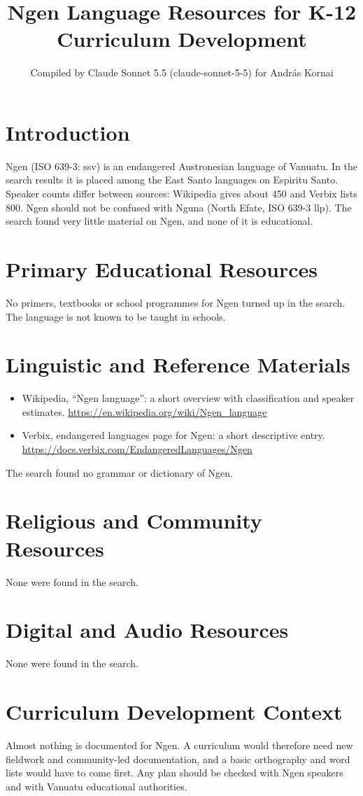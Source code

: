 \documentclass[12pt]{article}
\title{Ngen Language Resources for K-12 Curriculum Development}
\author{Compiled by Claude Sonnet 5.5 (claude-sonnet-5-5) for Andr\'as Kornai}
\date{}
\begin{document}
\maketitle

\section{Introduction}
Ngen (ISO 639-3: ssv) is an endangered Austronesian language of Vanuatu. In the search results it is placed among the East Santo languages on Espiritu Santo. Speaker counts differ between sources: Wikipedia gives about 450 and Verbix lists 800. Ngen should not be confused with Nguna (North Efate, ISO 639-3 llp). The search found very little material on Ngen, and none of it is educational.

\section{Primary Educational Resources}
No primers, textbooks or school programmes for Ngen turned up in the search. The language is not known to be taught in schools.

\section{Linguistic and Reference Materials}
\begin{itemize}
\item Wikipedia, ``Ngen language'': a short overview with classification and speaker estimates. \url{https://en.wikipedia.org/wiki/Ngen_language}
\item Verbix, endangered languages page for Ngen: a short descriptive entry. \url{https://docs.verbix.com/EndangeredLanguages/Ngen}
\end{itemize}
The search found no grammar or dictionary of Ngen.

\section{Religious and Community Resources}
None were found in the search.

\section{Digital and Audio Resources}
None were found in the search.

\section{Curriculum Development Context}
Almost nothing is documented for Ngen. A curriculum would therefore need new fieldwork and community-led documentation, and a basic orthography and word lists would have to come first. Any plan should be checked with Ngen speakers and with Vanuatu educational authorities.
\end{document}
